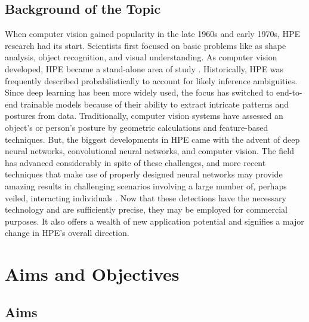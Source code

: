 \documentclass[runningheads]{llncs}
\begin{document}
    \subsection{Background of the Topic}
        When computer vision gained popularity in the late 1960s and early 1970s, HPE research had its start. Scientists first focused on basic problems like as shape analysis, object recognition, and visual understanding. As computer vision developed, HPE became a stand-alone area of study \parencite{Roboflow}. Historically, HPE was frequently described probabilistically to account for likely inference ambiguities. Since deep learning has been more widely used, the focus has switched to end-to-end trainable models because of their ability to extract intricate patterns and postures from data. Traditionally, computer vision systems have assessed an object's or person's posture by geometric calculations and feature-based techniques. But, the biggest developments in HPE came with the advent of deep neural networks, convolutional neural networks, and computer vision. The field has advanced considerably in spite of these challenges, and more recent techniques that make use of properly designed neural networks may provide amazing results in challenging scenarios involving a large number of, perhaps veiled, interacting individuals \parencite{liu2018recognizing}. Now that these detections have the necessary technology and are sufficiently precise, they may be employed for commercial purposes. It also offers a wealth of new application potential and signifies a major change in HPE's overall direction.



\section{Aims and Objectives} %
    \subsection{Aims}
        
\end{document}
